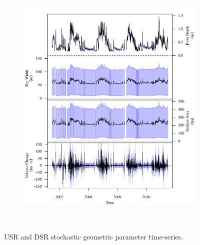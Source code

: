 \begin{landscape}
\begin{figure}
\begin{subfigure}{0.7\textwidth}
			\includegraphics[width=\tableCustomSize]{"Figures/Results_USR/Stochastic/G TS D"}
		\end{subfigure}\\
		\caption[]{USR and DSR stochastic geometric parameter time-series.}
	\end{figure}
\end{landscape}
\subfiguremid
